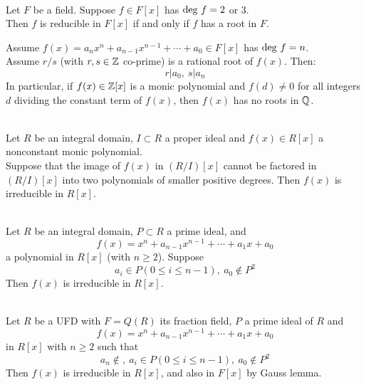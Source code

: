 \begin{proposition}
\\
Let $F$ be a field. Suppose $f \in F[x]$	 has $\textnormal{deg}\ f = 2$ or $3$. \\
Then $f$ is reducible in $F[x]$ if and only if $f$ has a root in $F$.
\end{proposition}

\begin{proposition}
Assume $f(x) = a_n x^n + a_{n-1} x^{n-1} + \cdots + a_0 \in F[x]$ has $\textnormal{deg}\ f = n$.\\
Assume $r/s$ (with $r, s \in \mathbb{Z}$ co-prime) is a rational root of $f(x)$. Then:
\begin{equation}
r|a_0,\ s|a_n \nonumber
\end{equation}	
In particular, if $f(x) \in \mathbb{Z}[x]$ is a monic polynomial and $f(d) \neq 0$ for all integers $d$ dividing the constant term of $f(x)$, then $f(x)$ has no roots in $\mathbb{Q}$.
\end{proposition}

\begin{proposition}
\\
Let $R$ be an integral domain, $I \subset R$ a proper ideal and $f(x) \in R[x]$ a nonconstant monic polynomial.\\
Suppose that the image of $f(x)$ in $(R/I)[x]$ cannot be factored in $(R/I)[x]$ into two polynomials of smaller positive degrees. Then $f(x)$ is irreducible in $R[x]$.
\end{proposition}

\begin{proposition}
\\
Let $R$ be an integral domain, $P \subset R$ a prime ideal, and
\begin{equation}
f(x) = x^n + a_{n-1} x^{n-1} + \cdots + a_1 x + a_0 \nonumber
\end{equation}
a polynomial in $R[x]$ (with $n \geq 2$). Suppose
\begin{equation}
a_i \in P(0\leq i \leq n-1),\ a_0 \notin P^2 \nonumber
\end{equation}
Then $f(x)$ is irreducible in $R[x]$.
\end{proposition}

\begin{proposition}
\\
Let $R$ be a UFD with $F=Q(R)$ its fraction field, $P$ a prime ideal of $R$ and
\begin{equation}
f(x) = x^n + a_{n-1} x^{n-1} + \cdots + a_1 x + a_0 \nonumber
\end{equation}
in $R[x]$ with $n \geq 2$ such that 
\begin{equation}
a_n \notin,\ a_i \in P(0\leq i \leq n-1),\ a_0 \notin P^2 \nonumber
\end{equation}
Then $f(x)$ is irreducible in $R[x]$, and also in $F[x]$ by Gauss lemma.
\end{proposition}

